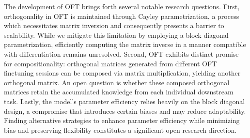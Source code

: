 The development of OFT brings forth several notable research questions. First, orthogonality in OFT is maintained through Cayley parametrization, a process which necessitates matrix inversion and consequently presents a barrier to scalability. While we mitigate this limitation by employing a block diagonal parametrization, efficiently computing the matrix inverse in a manner compatible with differentiation remains unresolved. Second, OFT exhibits distinct promise for compositionality: orthogonal matrices generated from different OFT finetuning sessions can be composed via matrix multiplication, yielding another orthogonal matrix. An open question is whether these composed orthogonal matrices retain the accumulated knowledge from each individual downstream task. Lastly, the model's parameter efficiency relies heavily on the block diagonal design, a compromise that introduces certain biases and may reduce adaptability. Finding alternative strategies to enhance parameter efficiency while minimizing bias and preserving flexibility constitutes a significant open research direction.